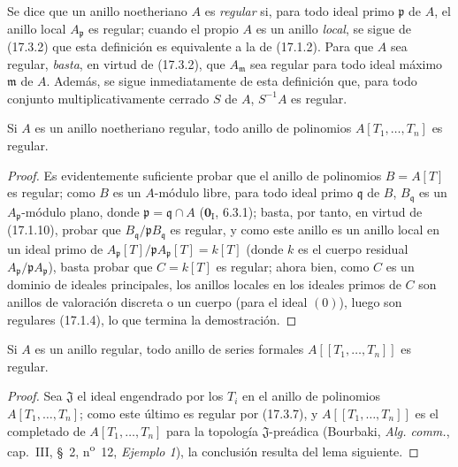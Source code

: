 \begin{env}[17.3.6]
\label{0.17.3.6-fr}
Se dice que un anillo noetheriano $A$ es \emph{regular} si, para todo ideal
primo $\mathfrak{p}$ de $A$, el anillo local $A_{\mathfrak{p}}$ es regular;
cuando el propio $A$ es un anillo \emph{local}, se sigue de (17.3.2) que esta
definición es equivalente a la de (17.1.2). Para que $A$ sea regular, \emph{basta},
en virtud de (17.3.2), que $A_{\mathfrak{m}}$ sea regular para todo ideal
máximo $\mathfrak{m}$ de $A$. Además, se sigue inmediatamente de esta
definición que, para todo conjunto multiplicativamente cerrado $S$ de $A$,
$S^{-1}A$ es regular.
\end{env}

\begin{proposition}[17.3.7]
\label{0.17.3.7-fr}
Si $A$ es un anillo noetheriano regular, todo anillo de polinomios
$A[T_1,\ldots,T_n]$ es regular.
\end{proposition}

\begin{proof}
Es evidentemente suficiente probar que el anillo de polinomios $B=A[T]$ es
regular; como $B$ es un $A$-módulo libre, para todo ideal primo
$\mathfrak{q}$ de $B$, $B_{\mathfrak{q}}$ es un
$A_{\mathfrak{p}}$-módulo plano, donde $\mathfrak{p}=\mathfrak{q}\cap A$
($\mathbf{0}_{\mathrm I}$, 6.3.1); basta, por tanto, en virtud de (17.1.10), probar que
$B_{\mathfrak{q}}/\mathfrak{p}B_{\mathfrak{q}}$ es regular, y como este anillo
es un anillo local en un ideal primo de
$A_{\mathfrak{p}}[T]/\mathfrak{p}A_{\mathfrak{p}}[T]=k[T]$ (donde $k$ es el
cuerpo residual $A_{\mathfrak{p}}/\mathfrak{p}A_{\mathfrak{p}}$), basta
probar que $C=k[T]$ es regular; ahora bien, como $C$ es un dominio de ideales
principales, los anillos locales en los ideales primos de $C$ son anillos de
valoración discreta o un cuerpo (para el ideal $(0)$), luego son regulares
(17.1.4), lo que termina la demostración.
\end{proof}

\begin{corollary}[17.3.8]
\label{0.17.3.8-fr}
Si $A$ es un anillo regular, todo anillo de series formales
$A[[T_1,\ldots,T_n]]$ es regular.
\end{corollary}

\begin{proof}
Sea $\mathfrak{J}$ el ideal engendrado por los $T_i$ en el anillo de polinomios
$A[T_1,\ldots,T_n]$; como este último es regular por (17.3.7), y
$A[[T_1,\ldots,T_n]]$ es el completado de $A[T_1,\ldots,T_n]$ para la
topología $\mathfrak{J}$-preádica (Bourbaki, \emph{Alg. comm.}, cap.~III,
\S~2, n\textsuperscript{o}~12, \emph{Ejemplo 1}), la conclusión resulta del lema siguiente.
\end{proof}


